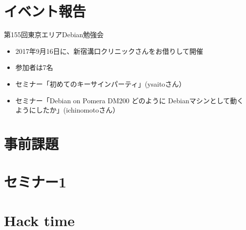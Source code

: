 \section{イベント報告}

\begin{frame}{第155回東京エリアDebian勉強会}
\begin{itemize}
\item 2017年9月16日に、新宿溝口クリニックさんをお借りして開催
\item 参加者は7名
\item セミナー「初めてのキーサインパーティ」(ysaitoさん）
\item セミナー「Debian on Pomera DM200 どのように Debianマシンとして動くようにしたか」(ichinomotoさん）
\end{itemize} 
\end{frame}


\section{事前課題}
{\footnotesize
 
}

%

\section{セミナー1}

\section{Hack time}

  
